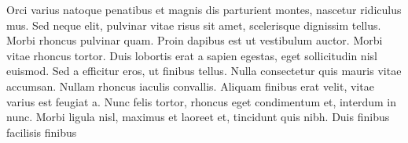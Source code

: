Orci varius natoque penatibus et magnis dis parturient montes, nascetur ridiculus mus. Sed neque elit, pulvinar vitae risus sit amet, scelerisque dignissim tellus. Morbi rhoncus pulvinar quam. Proin dapibus est ut vestibulum auctor. Morbi vitae rhoncus tortor. Duis lobortis erat a sapien egestas, eget sollicitudin nisl euismod. Sed a efficitur eros, ut finibus tellus. Nulla consectetur quis mauris vitae accumsan. Nullam rhoncus iaculis convallis. Aliquam finibus erat velit, vitae varius est feugiat a. Nunc felis tortor, rhoncus eget condimentum et, interdum in nunc. Morbi ligula nisl, maximus et laoreet et, tincidunt quis nibh. Duis finibus facilisis finibus
